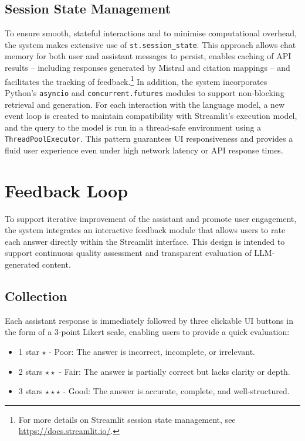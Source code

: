 \begin{spacing}{1.5}
\subsection{Session State Management}
To ensure smooth, stateful interactions and to minimise computational overhead, the system makes extensive use of \texttt{st.session\_state}. This approach allows chat memory for both user and assistant messages to persist, enables caching of API results -- including responses generated by Mistral and citation mappings -- and facilitates the tracking of feedback.\footnote{For more details on Streamlit session state management, see \url{https://docs.streamlit.io/}.\nocite{noauthor_streamlit_2025}} In addition, the system incorporates Python’s \texttt{asyncio} and \texttt{concurrent.futures} modules to support non-blocking retrieval and generation. For each interaction with the language model, a new event loop is created to maintain compatibility with Streamlit’s execution model, and the query to the model is run in a thread-safe environment using a \texttt{ThreadPoolExecutor}. This pattern guarantees UI responsiveness and provides a fluid user experience even under high network latency or API response times.

\section{Feedback Loop}
To support iterative improvement of the assistant and promote user engagement, the system integrates an interactive feedback module that allows users to rate each answer directly within the Streamlit interface. This design is intended to support continuous quality assessment and transparent evaluation of LLM-generated content.

\subsection{Collection}
Each assistant response is immediately followed by three clickable UI buttons in the form of a 3-point Likert scale, enabling users to provide a quick evaluation:
\begin{itemize}
\item 1 star $\star$ - Poor: The answer is incorrect, incomplete, or irrelevant.
\item 2 stars $\star\star$ - Fair: The answer is partially correct but lacks clarity or depth.
\item 3 stars $\star\star\star$ - Good: The answer is accurate, complete, and well-structured.
\end{itemize}


\end{spacing}
